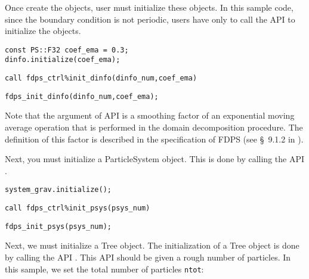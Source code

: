 Once create the objects, user must initialize these objects. In this sample code, since the boundary condition is not periodic, users have only to call the API  to initialize the objects.

\ifCpp %
\begin{lstlisting}[caption=Initialization of \textsf{DomainInfo} object]
const PS::F32 coef_ema = 0.3;
dinfo.initialize(coef_ema);
\end{lstlisting}
\endifCpp
\ifFtn %
\begin{lstlisting}[caption=Initialization of \textsf{DomainInfo} object]
call fdps_ctrl%init_dinfo(dinfo_num,coef_ema)
\end{lstlisting}
\endifFtn
\ifC %
\begin{lstlisting}[caption=Initialization of \textsf{DomainInfo} object]
fdps_init_dinfo(dinfo_num,coef_ema);
\end{lstlisting}
\endifC
Note that the  argument of API  is a smoothing factor of an exponential moving average operation that is performed in the domain decomposition procedure. The definition of this factor is described in the specification of FDPS (see \S~9.1.2 in ).


Next, you must initialize a \textsf{ParticleSystem} object. This is done by calling the API .

\ifCpp %
\begin{lstlisting}[caption=Initialization of \textsf{ParticleSystem} object]
system_grav.initialize();
\end{lstlisting}
\endifCpp
\ifFtn %
\begin{lstlisting}[caption=Initialization of \textsf{ParticleSystem} object]
call fdps_ctrl%init_psys(psys_num)
\end{lstlisting}
\endifFtn
\ifC %
\begin{lstlisting}[caption=Initialization of \textsf{ParticleSystem} object]
fdps_init_psys(psys_num);
\end{lstlisting}
\endifC


Next, we must initialize a \textsf{Tree} object. The initialization of a \textsf{Tree} object is done by calling the API . This API should be given a rough number of particles. In this sample, we set the total number of particles \texttt{ntot}:

